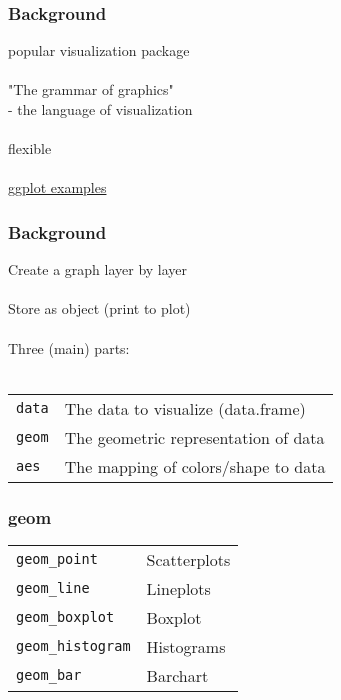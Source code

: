 \documentclass{beamer}
\begin{document}
\begin{frame}
	\frametitle{Background}
	\begin{center}
		popular visualization package \\~\\
		
		"The grammar of graphics" \\
		- the language of visualization \\~\\
		
		flexible \\~\\
		
		\href{http://shiny.stat.ubc.ca/r-graph-catalog/}{ggplot examples}
	\end{center}
\end{frame}

\begin{frame}
	\frametitle{Background}
	\begin{center}
		Create a graph layer by layer \\~\\
		
		Store as object (print to plot) \\~\\
		
		Three (main) parts: \\~\\
		
	\begin{table}
		\begin{tabular}{l l}
			\texttt{data} & The data to visualize (data.frame) \\
			\texttt{geom} & The geometric representation of data \\
			\texttt{aes} & The mapping of colors/shape to data \\
		\end{tabular}
	\end{table}
	\end{center}
\end{frame}

\begin{frame}
	\frametitle{geom}
	\begin{center}
		\begin{table}
			\begin{tabular}{l l}
				\texttt{geom\_point} & Scatterplots \\
				\texttt{geom\_line} & Lineplots \\
				\texttt{geom\_boxplot} & Boxplot \\
				\texttt{geom\_histogram} & Histograms \\
				\texttt{geom\_bar} & Barchart \\
			\end{tabular}
		\end{table}
	\end{center}
\end{frame}
\end{document}
